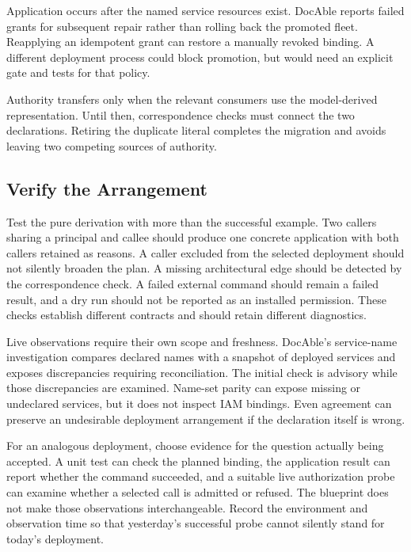 Application occurs after the named service resources exist. DocAble reports failed grants for subsequent repair rather than rolling back the promoted fleet. Reapplying an idempotent grant can restore a manually revoked binding. A different deployment process could block promotion, but would need an explicit gate and tests for that policy.

Authority transfers only when the relevant consumers use the model-derived representation. Until then, correspondence checks must connect the two declarations. Retiring the duplicate literal completes the migration and avoids leaving two competing sources of authority.

\subsection*{Verify the Arrangement}

Test the pure derivation with more than the successful example. Two callers sharing a principal and callee should produce one concrete application with both callers retained as reasons. A caller excluded from the selected deployment should not silently broaden the plan. A missing architectural edge should be detected by the correspondence check. A failed external command should remain a failed result, and a dry run should not be reported as an installed permission. These checks establish different contracts and should retain different diagnostics.

Live observations require their own scope and freshness. DocAble's service-name investigation compares declared names with a snapshot of deployed services and exposes discrepancies requiring reconciliation. The initial check is advisory while those discrepancies are examined. Name-set parity can expose missing or undeclared services, but it does not inspect IAM bindings. Even agreement can preserve an undesirable deployment arrangement if the declaration itself is wrong.

For an analogous deployment, choose evidence for the question actually being accepted. A unit test can check the planned binding, the application result can report whether the command succeeded, and a suitable live authorization probe can examine whether a selected call is admitted or refused. The blueprint does not make those observations interchangeable. Record the environment and observation time so that yesterday's successful probe cannot silently stand for today's deployment.

